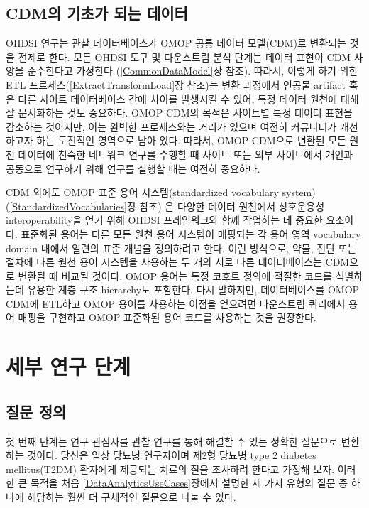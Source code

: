 \documentclass[10.5pt]{book}
\theoremstyle{definition}
\theoremstyle{definition}
\theoremstyle{definition}
\theoremstyle{remark}
\begin{document}
\subsection{CDM의 기초가 되는 데이터}\label{cdm---}

OHDSI 연구는 관찰 데이터베이스가 OMOP 공통 데이터 모델(CDM)로 변환되는
것을 전제로 한다. 모든 OHDSI 도구 및 다운스트림 분석 단계는 데이터
표현이 CDM 사양을 준수한다고 가정한다 (\ref{CommonDataModel}장 참조).
따라서, 이렇게 하기 위한 ETL 프로세스(\ref{ExtractTransformLoad}장
참조)는 변환 과정에서 인공물 artifact 혹은 다른 사이트 데이터베이스 간에
차이를 발생시킬 수 있어, 특정 데이터 원천에 대해 잘 문서화하는 것도
중요하다. OMOP CDM의 목적은 사이트별 특정 데이터 표현을 감소하는
것이지만, 이는 완벽한 프로세스와는 거리가 있으며 여전히 커뮤니티가
개선하고자 하는 도전적인 영역으로 남아 있다. 따라서, OMOP CDM으로 변환된
모든 원천 데이터에 친숙한 네트워크 연구를 수행할 때 사이트 또는 외부
사이트에서 개인과 공동으로 연구하기 위해 연구를 실행할 때는 여전히
중요하다.

CDM 외에도 OMOP 표준 용어 시스템(standardized vocabulary system)
(\ref{StandardizedVocabularies}장 참조) 은 다양한 데이터 원천에서
상호운용성 interoperability을 얻기 위해 OHDSI 프레임워크와 함께 작업하는
데 중요한 요소이다. 표준화된 용어는 다른 모든 원천 용어 시스템이
매핑되는 각 용어 영역 vocabulary domain 내에서 일련의 표준 개념을
정의하려고 한다. 이런 방식으로, 약물, 진단 또는 절차에 다른 원천 용어
시스템을 사용하는 두 개의 서로 다른 데이터베이스는 CDM으로 변환될 때
비교될 것이다. OMOP 용어는 특정 코호트 정의에 적절한 코드를 식별하는데
유용한 계층 구조 hierarchy도 포함한다. 다시 말하지만, 데이터베이스를
OMOP CDM에 ETL하고 OMOP 용어를 사용하는 이점을 얻으려면 다운스트림
쿼리에서 용어 매핑을 구현하고 OMOP 표준화된 용어 코드를 사용하는 것을
권장한다.

\section{세부 연구 단계}\label{--}

\subsection{질문 정의}\label{-}

첫 번째 단계는 연구 관심사를 관찰 연구를 통해 해결할 수 있는 정확한
질문으로 변환하는 것이다. 당신은 임상 당뇨병 연구자이며 제2형 당뇨병
type 2 diabetes mellitus(T2DM) 환자에게 제공되는 치료의 질을 조사하려
한다고 가정해 보자. 이러한 큰 목적을 처음
\ref{DataAnalyticsUseCases}장에서 설명한 세 가지 유형의 질문 중 하나에
해당하는 훨씬 더 구체적인 질문으로 나눌 수 있다.
\end{document}
